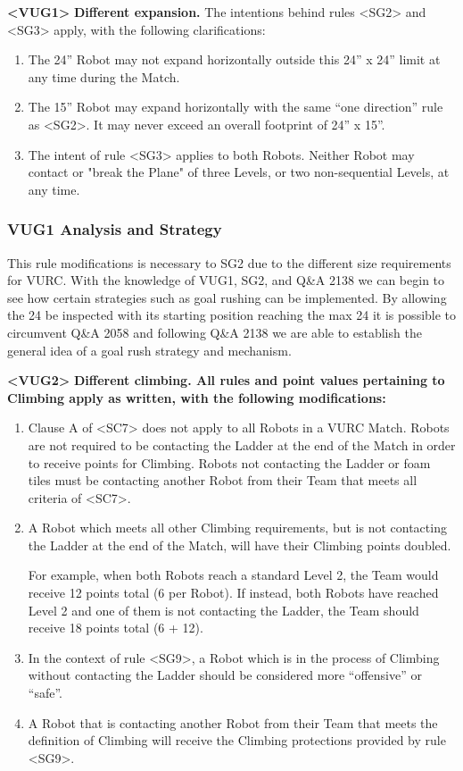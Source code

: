 \textbf{<VUG1>} \textbf{Different expansion.} The intentions behind rules <SG2> and <SG3> apply, with the following clarifications:

\begin{enumerate}
    \item The 24” Robot may not expand horizontally outside this 24” x 24” limit at any time during the Match.
    \item The 15” Robot may expand horizontally with the same “one direction” rule as <SG2>. It may never exceed an overall footprint of 24” x 15”.
    \item The intent of rule <SG3> applies to both Robots. Neither Robot may contact or "break the Plane" of three Levels, or two non-sequential Levels, at any time.
\end{enumerate}

\subsubsection{VUG1 Analysis and Strategy }


This rule modifications is necessary to SG2 due to the different size requirements for VURC.  
With the knowledge of VUG1, SG2, and Q\&A 2138 we can begin to see how certain strategies such as goal rushing can be implemented. By allowing the 24 be inspected with its starting position reaching the max 24 it is possible to circumvent Q\&A 2058 and following Q\&A 2138 we are able to establish the general idea of a goal rush strategy and mechanism. 
\newline

\textbf{<VUG2>} \textbf{Different climbing. All rules and point values pertaining to Climbing apply as written, with the following modifications:}

\begin{enumerate}
    \item Clause A of <SC7> does not apply to all Robots in a VURC Match. Robots are not required to be contacting the Ladder at the end of the Match in order to receive points for Climbing. Robots not contacting the Ladder or foam tiles must be contacting another Robot from their Team that meets all criteria of <SC7>.
    \item A Robot which meets all other Climbing requirements, but is not contacting the Ladder at the end of the Match, will have their Climbing points doubled.

For example, when both Robots reach a standard Level 2, the Team would receive 12 points total (6 per Robot). If instead, both Robots have reached Level 2 and one of them is not contacting the Ladder, the Team should receive 18 points total (6 + 12).

    \item In the context of rule <SG9>, a Robot which is in the process of Climbing without contacting the Ladder should be considered more “offensive” or “safe”.
    \item A Robot that is contacting another Robot from their Team that meets the definition of Climbing will receive the Climbing protections provided by rule <SG9>.
\end{enumerate}


